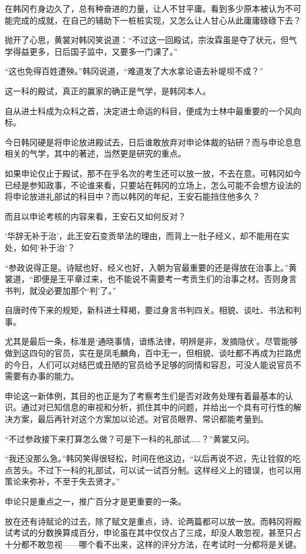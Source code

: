 在韩冈冇身边久了，总有种奋进的力量，让人不甘平庸。看到多少原本被认为不可能完成的成就，在自己的辅助下一桩桩实现，又怎么让人甘心从此庸庸碌碌下去？

抛开了心思，黄裳对韩冈笑说道：“不过这一回殿试，宗汝霖虽是夺了状元，但气学得益更多，日后国子监中，又要多一门课了。”

“这也免得百姓遭殃。”韩冈说道，“难道发了大水拿论语去补堤坝不成？”

这一科的殿试，真正的赢家的确正是气学，是韩冈本人。

自从进士科成为众科之首，决定进士命运的科目，便成为士林中最重要的一个风向标。

今日韩冈硬是将申论放进殿试去，日后谁敢放弃对申论体裁的钻研？而与申论息息相关的气学，其中的著述，当然更是研究的重点。

如果申论仅止于殿试，那不在乎名次的考生还可以放一放，不去在意。可韩冈如今已经是参知政事，不论谁来看，只要站在韩冈的立场上，怎么可能不会想方设法的将申论放进礼部试的科目中？而以韩冈的年纪，王安石能挡住他多久？

而且以申论考核的内容来看，王安石又如何反对？

‘华辞无补于治’，此王安石变贡举法的理由，而背上一肚子经义，却不能用在实处，如何‘补于治’？

“参政说得正是。诗赋也好、经义也好，入朝为官最重要的还是得放在治事上。”黄裳道，“即便是王平章过来，也不能说不需要考一考贡生们的治事之材。否则身言书判，就没必要加那个‘判’了。”

自唐时传下来的规矩，新科进士释褐，要过身言书判四关。相貌、谈吐、书法和判事。

尤其是最后一条，标准是‘通晓事情，谙练法律，明辨是非，发摘隐伏’。尽管能够做到这四句的官员，实在是凤毛麟角，百中无一，但相貌、谈吐都不再成为拦路虎的今日，人们可以对结巴或丑陋的官员给予足够的同情和容忍，可没人能说官员不需要有办事的能力。

申论这一新体例，其目的也正是为了考察考生们是否对政务处理有着最基本的认识。通过对已知信息的审视和分析，抓住其中的问题，并给出一个具有可行性的解决方案，最后再针对这个方案加以论述。对官员眼界、常识都能考量到。

“不过参政接下来打算怎么做？可是下一科的礼部试……？”黄裳又问。

“我还没那么急。”韩冈笑得很轻松，时间在他这边，“以后再说不迟，先让铨叙的吃点苦头。不过下一科的礼部试，可以试一试百分制。这样经义上的错误，也可以用策论来弥补，不至于失去贤才。”

申论只是重点之一，推广百分才是更重要的一条。

放在还有诗赋论的过去，除了赋文是重点，诗、论两篇都可以放一放。而韩冈将殿试考试的分数换算成百分，申论虽在其中仅仅占了三成，却没人敢忽视，甚至只占十分都不敢忽视——哪个看不出来，这样的评分方法，在考试时一分都将是关键。

